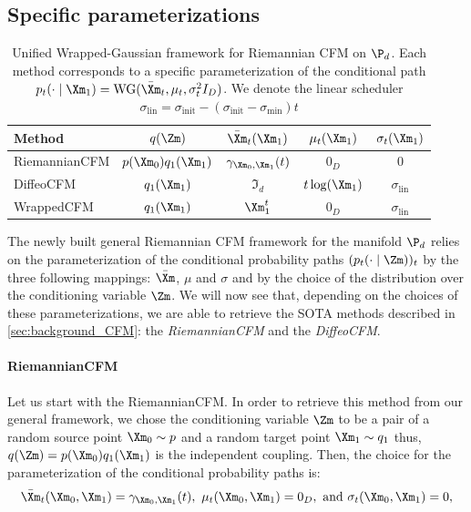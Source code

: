 \documentclass[10pt]{article} %
\theoremstyle{plain}
\theoremstyle{definition}
\theoremstyle{remark}
\begin{document}
\subsection{Specific parameterizations}
\begin{table}[t]
  \centering
  \small
  \setlength{\tabcolsep}{6pt}
  \begin{tabular}{lcccc}
    \toprule
    \textbf{Method}
    & $q(\Zm)$
    & $\bar{\Xm}_t(\Xm_1)$
    & $\mu_t(\Xm_1)$
    & $\sigma_t(\Xm_1)$
    \\
    \midrule
    RiemannianCFM
    & $p(\Xm_0)q_1(\Xm_1)$
    & $\gamma_{\Xm_0,\Xm_1}(t)$
    & $0_D$
    & $0$
    \\

    DiffeoCFM
    & $q_1(\Xm_1)$
    & $\Im_d$
    & $t\log(\Xm_1)$
    & $\sigma_{\text{lin}}$
    \\

    WrappedCFM
    & $q_1(\Xm_1)$
    & $\Xm_1^{t}$
    & $0_D$
    & $\sigma_{\text{lin}}$
    \\
    \bottomrule
  \end{tabular}%

  \caption{Unified Wrapped-Gaussian framework for Riemannian CFM on $\P_d$. Each method corresponds to a specific parameterization of the conditional path $p_t(\cdot\mid \Xm_1)=\mathrm{WG}(\bar{\Xm}_t,\mu_t,\sigma_t^2 I_D)$. We denote the linear scheduler $\sigma_{\text{lin}} = \sigma_{\text{init}} - \left(\sigma_{\text{init}} - \sigma_{\min}\right)t$}
  \label{tab:wg_framework}
\end{table}

The newly built general Riemannian CFM framework for the manifold $\P_d$ relies on the parameterization of the conditional probability paths $(p_t(\cdot \mid \Zm))_t$ by the three following mappings: $\bar{\Xm}$, $\mu$ and $\sigma$ and by the choice of the distribution over the conditioning variable $\Zm$. We will  now see that, depending on the choices of these parameterizations, we are able to retrieve the SOTA methods described in \cref{sec:background_CFM}: the \emph{RiemannianCFM} and the \emph{DiffeoCFM}.
\paragraph{RiemannianCFM} Let us start with the RiemannianCFM. In order to retrieve this method from our general framework, we chose the conditioning variable $\Zm$ to be a pair of a random source point $\Xm_0 \sim p$ and a random target point $\Xm_1 \sim q_1$ thus, $q(\Zm) = p(\Xm_0)q_1(\Xm_1)$ is the independent coupling. Then, the choice for the parameterization of the conditional probability paths is:
\[        \bar{\Xm}_t(\Xm_0, \Xm_1) = \gamma_{\Xm_0, \Xm_1}(t),~
  \mu_t(\Xm_0, \Xm_1) = 0_D, \text{ and }
  \sigma_t(\Xm_0, \Xm_1) = 0,
\]
\end{document}
